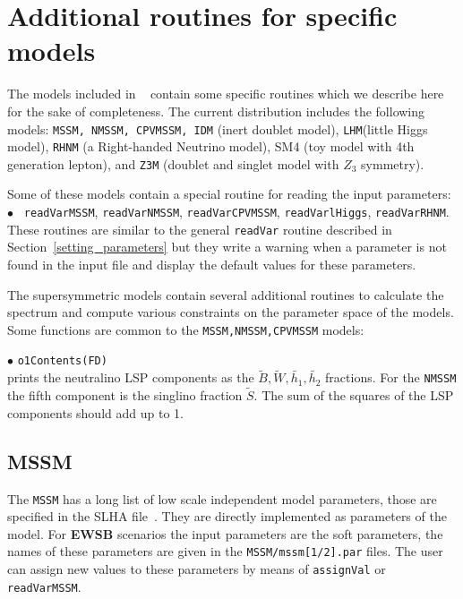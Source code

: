 \documentclass[12pt,a4paper]{article}
\begin{document}
\section{Additional routines for specific models}
The models included in \micro~ contain some specific routines
which we describe here for the sake of completeness. The current 
distribution includes the following models: {\tt MSSM, NMSSM, CPVMSSM, IDM}  (inert doublet model), {\tt LHM}(little Higgs model),
{\tt RHNM} (a Right-handed Neutrino model), SM4 (toy model with 4th generation lepton), and {\tt Z3M} (doublet and singlet model with $Z_3$ symmetry). 

Some of these models contain a special routine for reading the input parameters:\\
$\bullet$ \verb| readVarMSSM|, \verb|readVarNMSSM|,  \verb|readVarCPVMSSM|,
\verb|readVarlHiggs|, \verb|readVarRHNM|.\\
 These routines  are similar to the general 
\verb|readVar| routine described  in Section~\ref{setting_parameters}
but  they write a warning when a parameter is not found in the 
input file and display the default values for these parameters.

The supersymmetric models contain several additional routines to calculate the spectrum
and compute various constraints on the parameter space of the models. Some functions are
common to the \verb|MSSM,NMSSM,CPVMSSM| models: 


\noindent
$\bullet$  \verb|o1Contents(FD)|\\
prints  the neutralino LSP components as the  $\tilde{B},\tilde{W},
\tilde{h_1},\tilde{h_2}$ fractions. For the {\tt NMSSM} the fifth component is
the singlino fraction  $\tilde{S}$. The sum of the squares of the LSP components
should add up to 1. 



\subsection{MSSM}
The {\tt MSSM} has a long list of low scale  independent model 
parameters, those are specified in the SLHA file~\cite{Skands:2003cj,Allanach:2008qq}.
They are directly implemented as parameters of the model.
For {\bf EWSB} scenarios the input parameters are  the soft parameters, the names 
of these parameters are given in the {\tt MSSM/mssm[1/2].par} files.
The user  can assign new values to these parameters by means of {\tt assignVal}
or {\tt readVarMSSM}.
\end{document}
